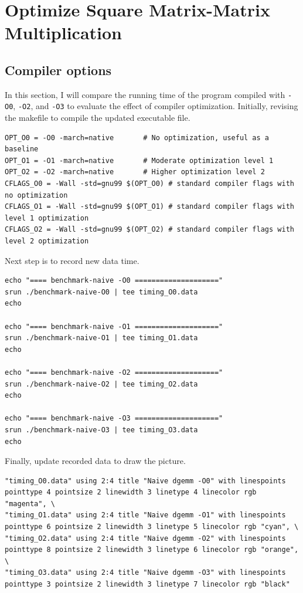 \documentclass[unicode,11pt,a4paper,oneside,numbers=endperiod,openany]{scrartcl}
\begin{document}
\section{Optimize Square Matrix-Matrix Multiplication  }
\subsection{Compiler options}
In this section, I will compare the running time of the program compiled with \texttt{-O0}, \texttt{-O2}, and \texttt{-O3} to evaluate the effect of compiler optimization. Initially, revising the makefile to compile the updated executable file.
\begin{lstlisting}[language=MyBatch, style=mystyle, caption={Makefile of Compiler options}]
OPT_O0 = -O0 -march=native       # No optimization, useful as a baseline
OPT_O1 = -O1 -march=native       # Moderate optimization level 1
OPT_O2 = -O2 -march=native       # Higher optimization level 2
CFLAGS_O0 = -Wall -std=gnu99 $(OPT_O0) # standard compiler flags with no optimization
CFLAGS_O1 = -Wall -std=gnu99 $(OPT_O1) # standard compiler flags with level 1 optimization
CFLAGS_O2 = -Wall -std=gnu99 $(OPT_O2) # standard compiler flags with level 2 optimization
\end{lstlisting}
Next step is to record new data time.
\begin{lstlisting}[language=MyBatch, style=mystyle, caption={Script of Compiler options}]
echo "==== benchmark-naive -O0 ===================="
srun ./benchmark-naive-O0 | tee timing_O0.data
echo

echo "==== benchmark-naive -O1 ===================="
srun ./benchmark-naive-O1 | tee timing_O1.data
echo

echo "==== benchmark-naive -O2 ===================="
srun ./benchmark-naive-O2 | tee timing_O2.data
echo

echo "==== benchmark-naive -O3 ===================="
srun ./benchmark-naive-O3 | tee timing_O3.data
echo
\end{lstlisting}
Finally, update recorded data to draw the picture.
\begin{lstlisting}[language=MyBatch, style=mystyle, caption={Plot of Compiler options}]
"timing_O0.data" using 2:4 title "Naive dgemm -O0" with linespoints pointtype 4 pointsize 2 linewidth 3 linetype 4 linecolor rgb "magenta", \
"timing_O1.data" using 2:4 title "Naive dgemm -O1" with linespoints pointtype 6 pointsize 2 linewidth 3 linetype 5 linecolor rgb "cyan", \
"timing_O2.data" using 2:4 title "Naive dgemm -O2" with linespoints pointtype 8 pointsize 2 linewidth 3 linetype 6 linecolor rgb "orange", \
"timing_O3.data" using 2:4 title "Naive dgemm -O3" with linespoints pointtype 3 pointsize 2 linewidth 3 linetype 7 linecolor rgb "black"
\end{lstlisting}
\end{document}
